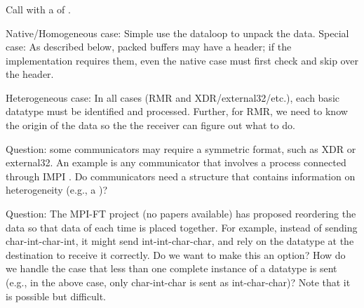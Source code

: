 \documentclass{article}
\begin{document}
\subsubsection{}
\label{sec:mpi-unpack}
Call  with a  of .

\begin{adi3}
Native/Homogeneous case: Simple use the dataloop to unpack the data.
Special case: As described below, packed buffers may have a header; if the
implementation requires them, even the native case must first check and skip
over the header.

Heterogeneous case:  In all cases (RMR and XDR/external32/etc.), each basic
datatype must be identified and processed.  Further, for RMR, we need to know
the origin of the data so the the receiver can figure out what to do.

Question: some communicators may require a symmetric format, such as XDR or
external32.  An example is any communicator that involves a process connected
through IMPI \cite{impi}.  Do communicators need a structure that contains
information on heterogeneity (e.g., a )?

Question:  The MPI-FT project (no papers available) has proposed reordering
the data so that data of each time is placed together.  For example, instead
of sending char-int-char-int, it might send int-int-char-char, and rely on the
datatype at the destination to receive it correctly.  Do we want to make this
an option?  How do we handle the case that less than one complete instance of
a datatype is sent (e.g., in the above case, only char-int-char is sent as
int-char-char)?  Note that it is possible but difficult.
\end{adi3}
\end{document}
